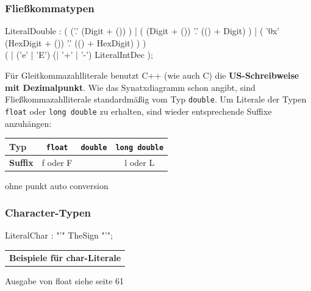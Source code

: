 \documentclass[a4paper]{report}
\begin{document}
\subsubsection{Fließkommatypen}

\begin{rail}
	LiteralDouble : (
						('.' 
							(Digit + ())
						) |
						(
							(Digit + ())
							'.' (() + Digit)
						) |
						(
							'0x'
							(HexDigit + ())
							'.'
							(() + HexDigit)
						)
					) \\
					( | 
						('e' | 'E') 
						(| '+' | '-') 
						LiteralIntDec
					);
\end{rail}

Für Gleitkommazahlliterale benutzt C++ (wie auch C) die \textbf{US-Schreibweise mit Dezimalpunkt}. Wie das Synatxdiagramm schon angibt, sind Fließkommazahlliterale standardmäßig vom Typ \texttt{double}. Um Literale der Typen \texttt{float} oder \texttt{long double} zu erhalten, sind wieder entsprechende Suffixe anzuhängen:
\begin{center}
\begin{tabular}{|l|c|c|c|} \hline
	\textbf{Typ} & \texttt{float} & \texttt{double} & \texttt{long double} \\ \hline
	\textbf{Suffix} & f oder F & & l oder L \\ \hline
\end{tabular}
\end{center}

ohne punkt auto conversion

\subsubsection{Character-Typen}

\begin{rail}
	LiteralChar : "'" TheSign "'";
\end{rail}

\begin{tabular}{c}
	\textbf{Beispiele für char-Literale}
\end{tabular}

Ausgabe von float siehe seite 61
\end{document}
